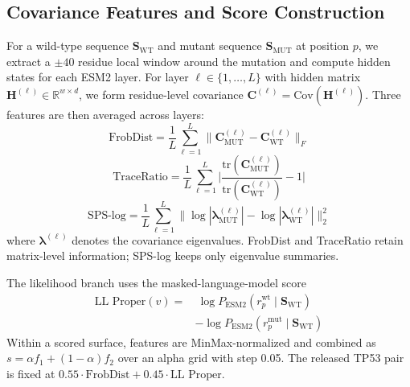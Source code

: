 \documentclass[10pt,twocolumn,letterpaper]{article}
\begin{document}
\subsection{Covariance Features and Score Construction}

For a wild-type sequence $\mathbf{S}_{\text{WT}}$ and mutant sequence
$\mathbf{S}_{\text{MUT}}$ at position $p$, we extract a $\pm 40$ residue local window
around the mutation and compute hidden states for each ESM2 layer. For layer
$\ell \in \{1,\dots,L\}$ with hidden matrix
$\mathbf{H}^{(\ell)} \in \mathbb{R}^{w \times d}$, we form residue-level covariance
$\mathbf{C}^{(\ell)} = \mathrm{Cov}(\mathbf{H}^{(\ell)})$. Three features are then
averaged across layers:
\begin{equation}\label{eq:frob}
  \text{FrobDist} = \frac{1}{L}\sum_{\ell=1}^{L}
    \bigl\|\mathbf{C}^{(\ell)}_{\text{MUT}} - \mathbf{C}^{(\ell)}_{\text{WT}}\bigr\|_F
\end{equation}
\vspace{-10pt}
\begin{equation}\label{eq:trace}
  \text{TraceRatio} = \frac{1}{L}\sum_{\ell=1}^{L}
    \biggl|\frac{\mathrm{tr}(\mathbf{C}^{(\ell)}_{\text{MUT}})}
               {\mathrm{tr}(\mathbf{C}^{(\ell)}_{\text{WT}})} - 1\biggr|
\end{equation}
\vspace{-10pt}
\begin{equation}\label{eq:sps}
  \text{SPS-log} = \frac{1}{L}\sum_{\ell=1}^{L}
    \bigl\|\log|\boldsymbol{\lambda}^{(\ell)}_{\text{MUT}}|
           - \log|\boldsymbol{\lambda}^{(\ell)}_{\text{WT}}|\bigr\|_2^2
\end{equation}
where $\boldsymbol{\lambda}^{(\ell)}$ denotes the covariance eigenvalues.
FrobDist and TraceRatio retain matrix-level information; SPS-log keeps only
eigenvalue summaries.

The likelihood branch uses the masked-language-model score
\begin{equation}\label{eq:ll}
\begin{aligned}
\text{LL Proper}(v)=&\ \log P_{\text{ESM2}}\!(r_p^{\text{wt}} \mid \mathbf{S}_{\text{WT}}) \\
&- \log P_{\text{ESM2}}\!(r_p^{\text{mut}} \mid \mathbf{S}_{\text{WT}})
\end{aligned}
\end{equation}
Within a scored surface, features are MinMax-normalized and combined as
$s=\alpha f_1 + (1-\alpha)f_2$ over an alpha grid with step 0.05. The released
TP53 pair is fixed at $0.55\cdot\text{FrobDist}+0.45\cdot\text{LL Proper}$.
\end{document}
